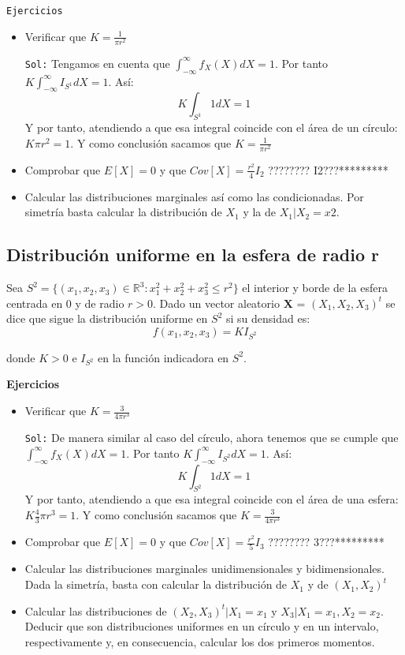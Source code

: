 \documentclass{article}
\theoremstyle{theorem-style}  %
\theoremstyle{definition}
\theoremstyle{example-style}
\begin{document}
	\texttt{Ejercicios}
	
	\begin{itemize}
		\item Verificar que $K=\frac{1}{\pi r^2}$
		
		\texttt{Sol:} Tengamos en cuenta que $\int_{-\infty}^{\infty} f_X(X) dX = 1$. Por tanto $K \int_{-\infty}^{\infty} I_{S^1} dX =1 $. Así: $$K \int_{S^1}^{}1dX = 1 $$ Y por tanto, atendiendo a que esa integral coincide con el área de un círculo: $K\pi r^2 = 1$. Y como conclusión sacamos que $K=\frac{1}{\pi r^2}$
		
		\item Comprobar que $E[X]=0$ y que $Cov[X] = \frac{r^2}{4}I_2$ ???????? I2???*********
		
		\item Calcular las distribuciones marginales así como las condicionadas. Por simetría basta calcular la distribución de $X_1$  y la de $X_1|X_2=x2$. 
		
		 
	\end{itemize} 
	
	
	\subsection{Distribución uniforme en la esfera de radio r}
	
	Sea $S^2=\{(x_1, x_2, x_3) \in  \mathbb{R}^3: x_1^2 + x_2^2+x_3^2\leq r^2\}$ el interior y borde de la esfera centrada en 0 y de radio $r>0$. Dado un vector aleatorio \textbf{X} = $(X_1, X_2, X_3)^t$ se dice que sigue la distribución uniforme en $S^2$ si su densidad es:
	$$ f(x_1, x_2, x_3)= KI_{S^2}$$
	
	donde $K>0$ e $I_{S^2}$ en la función indicadora en $S^2$. 
	
	\textbf{Ejercicios}
	\begin{itemize}
		\item Verificar que $K=\frac{3}{4\pi r^3}$
		
		\texttt{Sol:} De manera similar al caso del círculo, ahora tenemos que se cumple que $\int_{-\infty}^{\infty} f_X(X) dX = 1$. Por tanto $K \int_{-\infty}^{\infty} I_{S^2} dX =1 $. Así: $$K \int_{S^2}^{}1dX = 1 $$ Y por tanto, atendiendo a que esa integral coincide con el área de una esfera: $K\frac{4}{3}\pi r^3 = 1$. Y como conclusión sacamos que $K=\frac{3}{4\pi r^3}$
		
		\item   Comprobar que $E[X]=0$ y que $Cov[X] = \frac{r^2}{5}I_3$ ???????? 3???*********
		
		\item Calcular las distribuciones marginales unidimensionales y bidimensionales. Dada la simetría, basta con calcular la distribución de $X_1$ y de $(X_1, X_2)^t$
		
		\item Calcular las distribuciones de $(X_2, X_3)^t|X_1=x_1$ y $X_3|X_1=x_1, X_2=x_2$. Deducir que son distribuciones uniformes en un círculo y en un intervalo, respectivamente y, en consecuencia, calcular los dos primeros momentos.
		
	\end{itemize}
	
\end{document}
